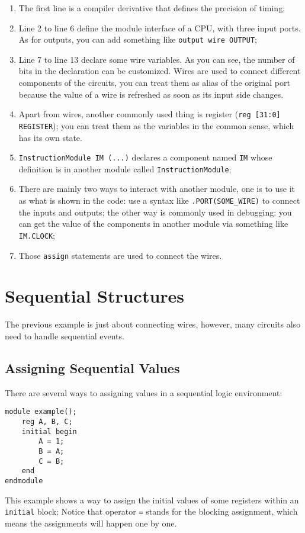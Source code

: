 \begin{enumerate}
	\item The first line is a compiler derivative that defines the precision of timing;
	\item Line 2 to line 6 define the module interface of a CPU, with three input ports. As for outputs, you can add something like \texttt{output wire OUTPUT};
	\item Line 7 to line 13 declare some wire variables. As you can see, the number of bits in the declaration can be customized. Wires are used to connect different components of the circuits, you can treat them as alias of the original port because the value of a wire is refreshed as soon as its input side changes.
	\item Apart from wires, another commonly used thing is register (\texttt{reg [31:0] REGISTER}); you can treat them as the variables in the common sense, which has its own state.
	\item \texttt{InstructionModule IM (...)} declares a component named \texttt{IM} whose definition is in another module called \texttt{InstructionModule};
	\item There are mainly two ways to interact with another module, one is to use it as what is shown in the code: use a syntax like \texttt{.PORT(SOME_WIRE)} to connect the inputs and outputs; the other way is commonly used in debugging: you can get the value of the components in another module via something like \texttt{IM.CLOCK};
	\item Those \texttt{assign} statements are used to connect the wires.
\end{enumerate}
\section{Sequential Structures}
The previous example is just about connecting wires, however, many circuits also need to handle sequential events.
\subsection{Assigning Sequential Values}
There are several ways to assigning values in a sequential logic environment:
\begin{verbatim}
module example();
    reg A, B, C;
    initial begin
        A = 1;
        B = A;
        C = B;
    end
endmodule
\end{verbatim}
This example shows a way to assign the initial values of some registers within an \texttt{initial} block; Notice that operator \texttt{=} stands for the blocking assignment, which means the assignments will happen one by one.

